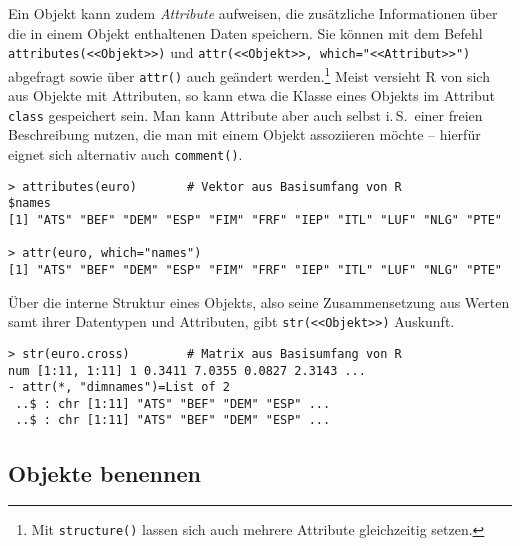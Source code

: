 Ein Objekt kann zudem \emph{Attribute} aufweisen, die zusätzliche Informationen über die in einem Objekt enthaltenen Daten speichern. Sie können mit dem Befehl \lstinline!attributes(<<Objekt>>)! und \lstinline!attr(<<Objekt>>, which="<<Attribut>>")! abgefragt sowie über \lstinline!attr()! auch geändert werden.\footnote{Mit  \lstinline!structure()! lassen sich auch mehrere Attribute gleichzeitig setzen.} Meist versieht R von sich aus Objekte mit Attributen, so kann etwa die Klasse eines Objekts im Attribut \lstinline!class! gespeichert sein. Man kann Attribute aber auch selbst i.\,S.\ einer freien Beschreibung nutzen, die man mit einem Objekt assoziieren möchte -- hierfür eignet sich alternativ auch \lstinline!comment()!.
\begin{lstlisting}
> attributes(euro)       # Vektor aus Basisumfang von R
$names
[1] "ATS" "BEF" "DEM" "ESP" "FIM" "FRF" "IEP" "ITL" "LUF" "NLG" "PTE"

> attr(euro, which="names")
[1] "ATS" "BEF" "DEM" "ESP" "FIM" "FRF" "IEP" "ITL" "LUF" "NLG" "PTE"
\end{lstlisting}

Über die interne Struktur eines Objekts, also seine Zusammensetzung aus Werten samt ihrer Datentypen und Attributen, gibt \lstinline!str(<<Objekt>>)! Auskunft.
\begin{lstlisting}
> str(euro.cross)        # Matrix aus Basisumfang von R
num [1:11, 1:11] 1 0.3411 7.0355 0.0827 2.3143 ...
- attr(*, "dimnames")=List of 2
 ..$ : chr [1:11] "ATS" "BEF" "DEM" "ESP" ...
 ..$ : chr [1:11] "ATS" "BEF" "DEM" "ESP" ...
\end{lstlisting}

\subsection{Objekte benennen}
\label{sec:objectNames}

